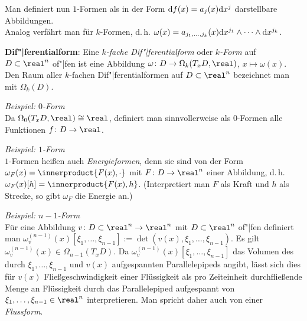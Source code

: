 Man definiert nun $1$-Formen als in der Form
$\mathrm{d} f(x) = a_j(x) \mathrm{d} x^j$ darstellbare Abbildungen. \\
Analog verfährt man für $k$-Formen, d.\,h.
$\omega(x) = a_{j_1,\dotsc,j_k}(x) \mathrm{d} x^{j_1} \land \dotsb \land \mathrm{d} x^{j_k}$.

\linie

\textbf{Dif"|ferentialform}:
Eine \emph{$k$-fache Dif"|ferentialform} oder \emph{$k$-Form} auf
$D \subset \real^n$ of"|fen ist eine Abbildung
$\omega\colon D \rightarrow \Omega_k(T_x D, \real)$,
$x \mapsto \omega(x)$. \\
Den Raum aller $k$-fachen Dif"|ferentialformen auf $D \subset \real^n$
bezeichnet man mit $\Omega_k(D)$.

\emph{Beispiel: $0$-Form} \\
Da $\Omega_0(T_x D, \real) \cong \real$,
definiert man sinnvollerweise als $0$-Formen alle Funktionen
$f\colon D \rightarrow \real$.

\emph{Beispiel: $1$-Form} \\
$1$-Formen heißen auch \emph{Energieformen}, denn sie sind von der Form
$\omega_F(x) = \innerproduct{F(x), \cdot}$ mit
$F\colon D \rightarrow \real^n$ einer Abbildung, d.\,h.
$\omega_F(x)[h] = \innerproduct{F(x), h}$.
(Interpretiert man $F$ als Kraft und $h$ als Strecke, so gibt $\omega_F$
die Energie an.)

\emph{Beispiel: $n - 1$-Form} \\
Für eine Abbildung $v\colon D \subset \real^n \rightarrow \real^n$ mit
$D \subset \real^n$ of"|fen definiert man
$\omega_v^{(n-1)}(x)[\xi_1, \dotsc, \xi_{n-1}] :=
\det(v(x), \xi_1, \dotsc, \xi_{n-1})$.
Es gilt $\omega_v^{(n-1)}(x) \in \Omega_{n-1}(T_x D)$.
Da $\omega_v^{(n-1)}(x)[\xi_1, \dotsc, \xi_{n-1}]$ das Volumen des durch
$\xi_1, \dotsc, \xi_{n-1}$ und $v(x)$ aufgespannten Parallelepipeds angibt,
lässt sich dies für $v(x)$ Fließgeschwindigkeit einer Flüssigkeit
als pro Zeiteinheit durchfließende Menge an Flüssigkeit durch das
Parallelepiped aufgespannt von $\xi_1, \dotsc, \xi_{n-1} \in \real^n$
interpretieren.
Man spricht daher auch von einer \emph{Flussform}.


